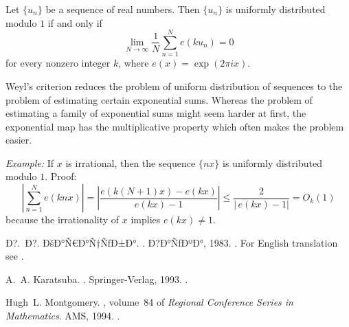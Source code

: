 \documentclass[12pt]{article}
\newcommand*{\abs}[1]{\left\lvert #1\right\rvert}
\begin{document}
Let $\{u_n\}$ be a sequence of real numbers. Then $\{u_n\}$ is
uniformly distributed modulo $1$ if and only if
\begin{equation*}
\lim_{N\to\infty} \frac{1}{N} \sum_{n=1}^N e(k u_n)=0
\end{equation*}
for every nonzero integer $k$, where $e(x)=\exp(2\pi i x)$.

Weyl's criterion reduces the problem of uniform distribution of
sequences to the problem of estimating certain exponential sums.
Whereas the problem of estimating a family of exponential sums
might seem harder at first, the exponential map has the
multiplicative property which often makes the problem easier.

\emph{Example:} If $x$ is irrational, then the sequence $\{nx\}$
is uniformly distributed modulo $1$. Proof:
\begin{equation*}
\abs{\sum_{n=1}^{N} e(k n
x)}=\abs{\frac{e(k(N+1)x)-e(kx)}{e(kx)-1}}\leq
\frac{2}{\abs{\,e(kx)-1}}=O_k(1)
\end{equation*}
because the irrationality of $x$ implies $e(kx)\neq 1$.

\begin{thebibliography}{1}

Ð?.~Ð?. ÐšÐ°Ñ€Ð°Ñ†ÑƒÐ±Ð°.
.
\newblock Ð?Ð°ÑƒÐºÐ°, 1983.
\newblock {}.
\newblock For English translation see \cite{cite:karatsuba_ant_eng}.

A.~A. Karatsuba.
.
\newblock Springer-Verlag, 1993.
\newblock {}.

Hugh~L. Montgomery.
, volume~84 of {\em Regional Conference Series in
  Mathematics}.
\newblock AMS, 1994.
\newblock {}.

\end{thebibliography}
\end{document}
